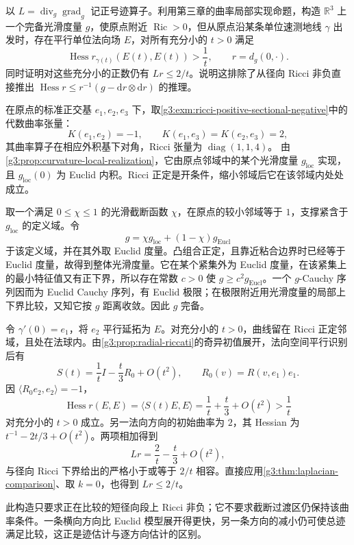 \begin{exercise}\label{g3:ex:ricci-bound-not-hessian-bound}
	以 \(L=\operatorname{div}_g\operatorname{grad}_g\) 记正号迹算子。利用第三章的曲率局部实现命题，构造 \(\mathbb R^3\) 上一个完备光滑度量 \(g\)，使原点附近 \(\operatorname{Ric}>0\)，但从原点沿某条单位速测地线 \(\gamma\) 出发时，存在平行单位法向场 \(E\)，对所有充分小的 \(t>0\) 满足
	\[
		\operatorname{Hess}r_{\gamma(t)}(E(t),E(t))>\frac1t,
		\qquad r=d_g(0,\cdot).
	\]
	同时证明对这些充分小的正数仍有 \(Lr\le2/t\)。说明这排除了从径向 Ricci 非负直接推出
	\(\operatorname{Hess}r\le r^{-1}(g-\mathrm dr\otimes\mathrm dr)\)
	的推理。
\end{exercise}
\begin{solution}
	在原点的标准正交基 \(e_1,e_2,e_3\) 下，取\cref{g3:exm:ricci-positive-sectional-negative}中的代数曲率张量：
	\[
		K(e_1,e_2)=-1,\qquad
		K(e_1,e_3)=K(e_2,e_3)=2,
	\]
	其曲率算子在相应外积基下对角，Ricci 张量为
	\(\operatorname{diag}(1,1,4)\)。
	由\cref{g3:prop:curvature-local-realization}，它由原点邻域中的某个光滑度量 \(g_{\mathrm{loc}}\) 实现，且 \(g_{\mathrm{loc}}(0)\) 为 Euclid 内积。Ricci 正定是开条件，缩小邻域后它在该邻域内处处成立。

	取一个满足 \(0\le\chi\le1\) 的光滑截断函数 \(\chi\)，在原点的较小邻域等于 \(1\)，支撑紧含于 \(g_{\mathrm{loc}}\) 的定义域。令
	\[
		g=\chi g_{\mathrm{loc}}+(1-\chi)g_{\mathrm{Eucl}}
	\]
	于该定义域，并在其外取 Euclid 度量。凸组合正定，且靠近粘合边界时已经等于 Euclid 度量，故得到整体光滑度量。它在某个紧集外为 Euclid 度量，在该紧集上的最小特征值又有正下界，所以存在常数 \(c>0\) 使 \(g\ge c^2g_{\mathrm{Eucl}}\)。一个 \(g\)-Cauchy 序列因而为 Euclid Cauchy 序列，有 Euclid 极限；在极限附近用光滑度量的局部上下界比较，又知它按 \(g\) 距离收敛。因此 \(g\) 完备。

	令 \(\gamma'(0)=e_1\)，将 \(e_2\) 平行延拓为 \(E\)。对充分小的 \(t>0\)，曲线留在 Ricci 正定邻域，且处在法球内。由\cref{g3:prop:radial-riccati}的奇异初值展开，法向空间平行识别后有
	\[
		S(t)=\frac1tI-\frac t3R_0+O(t^2),
		\qquad R_0(v)=R(v,e_1)e_1.
	\]
	因 \(\langle R_0e_2,e_2\rangle=-1\)，
	\[
		\operatorname{Hess}r(E,E)
		=\langle S(t)E,E\rangle
		=\frac1t+\frac t3+O(t^2)>\frac1t
	\]
	对充分小的 \(t>0\) 成立。另一法向方向的初始曲率为 \(2\)，其 Hessian 为
	\(t^{-1}-2t/3+O(t^2)\)。两项相加得到
	\[
		Lr=\frac2t-\frac t3+O(t^2),
	\]
	与径向 Ricci 下界给出的严格小于或等于 \(2/t\) 相容。直接应用\cref{g3:thm:laplacian-comparison}、取 \(k=0\)，也得到 \(Lr\le2/t\)。

	此构造只要求正在比较的短径向段上 Ricci 非负；它不要求截断过渡区仍保持该曲率条件。一条横向方向比 Euclid 模型展开得更快，另一条方向的减小仍可使总迹满足比较，这正是迹估计与逐方向估计的区别。
\end{solution}

